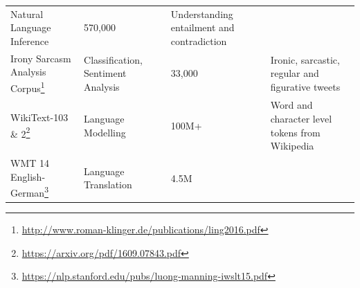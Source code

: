 \documentclass[]{krantz}
\renewcommand{\href}[2]{#2\footnote{\url{#1}}}
\begin{document}
\begin{longtable}[]{@{}llll@{}}
\begin{minipage}[t]{0.24\columnwidth}
Natural Language Inference\strut
\end{minipage} & \begin{minipage}[t]{0.10\columnwidth}\raggedright
570,000\strut
\end{minipage} & \begin{minipage}[t]{0.23\columnwidth}\raggedright
Understanding entailment and contradiction\strut
\end{minipage}\tabularnewline
\begin{minipage}[t]{0.31\columnwidth}\raggedright
\href{http://www.roman-klinger.de/publications/ling2016.pdf}{Irony Sarcasm Analysis Corpus}\strut
\end{minipage} & \begin{minipage}[t]{0.24\columnwidth}\raggedright
Classification, Sentiment Analysis\strut
\end{minipage} & \begin{minipage}[t]{0.10\columnwidth}\raggedright
33,000\strut
\end{minipage} & \begin{minipage}[t]{0.23\columnwidth}\raggedright
Ironic, sarcastic, regular and figurative tweets\strut
\end{minipage}\tabularnewline
\begin{minipage}[t]{0.31\columnwidth}\raggedright
\href{https://arxiv.org/pdf/1609.07843.pdf}{WikiText-103 \& 2}\strut
\end{minipage} & \begin{minipage}[t]{0.24\columnwidth}\raggedright
Language Modelling\strut
\end{minipage} & \begin{minipage}[t]{0.10\columnwidth}\raggedright
100M+\strut
\end{minipage} & \begin{minipage}[t]{0.23\columnwidth}\raggedright
Word and character level tokens from Wikipedia\strut
\end{minipage}\tabularnewline
\begin{minipage}[t]{0.31\columnwidth}\raggedright
\href{https://nlp.stanford.edu/pubs/luong-manning-iwslt15.pdf}{WMT 14 English-German}\strut
\end{minipage} & \begin{minipage}[t]{0.24\columnwidth}\raggedright
Language Translation\strut
\end{minipage} & \begin{minipage}[t]{0.10\columnwidth}\raggedright
4.5M\strut
\end{minipage} & \begin{minipage}[t]{0.23\columnwidth}\raggedright

\end{minipage}
\end{longtable}
\end{document}
